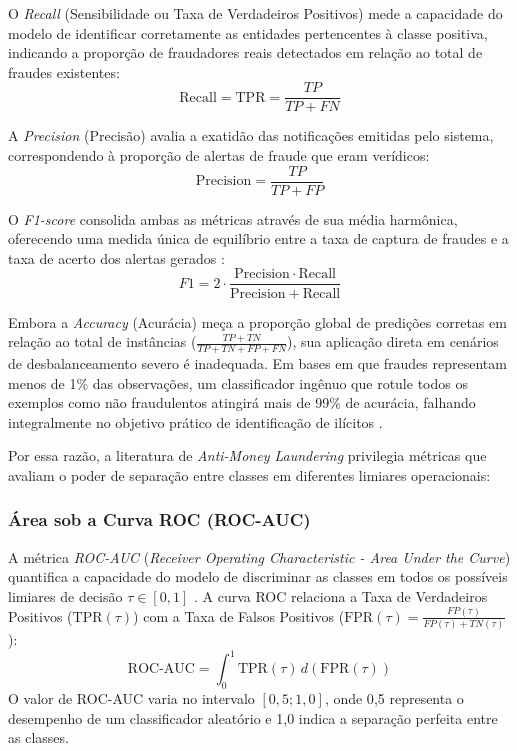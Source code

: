 \documentclass[a4paper,12pt,oneside,onecolumn,final,fleqn]{repUERJ}
\begin{document}
O \textit{Recall} (Sensibilidade ou Taxa de Verdadeiros Positivos) mede a capacidade do modelo de identificar corretamente as entidades pertencentes à classe positiva, indicando a proporção de fraudadores reais detectados em relação ao total de fraudes existentes:
\begin{equation}
    \mathrm{Recall} = \mathrm{TPR} = \frac{TP}{TP+FN}
\end{equation}

A \textit{Precision} (Precisão) avalia a exatidão das notificações emitidas pelo sistema, correspondendo à proporção de alertas de fraude que eram verídicos:
\begin{equation}
    \mathrm{Precision} = \frac{TP}{TP+FP}
\end{equation}

O \textit{F1-score} consolida ambas as métricas através de sua média harmônica, oferecendo uma medida única de equilíbrio entre a taxa de captura de fraudes e a taxa de acerto dos alertas gerados \cite{alarab2020comparative}:
\begin{equation}
    F1 = 2 \cdot \frac{\mathrm{Precision} \cdot \mathrm{Recall}}{\mathrm{Precision} + \mathrm{Recall}}
\end{equation}

Embora a \textit{Accuracy} (Acurácia) meça a proporção global de predições corretas em relação ao total de instâncias ($ \frac{TP+TN}{TP+TN+FP+FN} $), sua aplicação direta em cenários de desbalanceamento severo é inadequada. Em bases em que fraudes representam menos de 1\% das observações, um classificador ingênuo que rotule todos os exemplos como não fraudulentos atingirá mais de 99\% de acurácia, falhando integralmente no objetivo prático de identificação de ilícitos \cite{vassallo2021application}.

Por essa razão, a literatura de \textit{Anti-Money Laundering} privilegia métricas que avaliam o poder de separação entre classes em diferentes limiares operacionais:

\subsubsection{Área sob a Curva ROC (ROC-AUC)}
A métrica \textit{ROC-AUC} (\textit{Receiver Operating Characteristic - Area Under the Curve}) quantifica a capacidade do modelo de discriminar as classes em todos os possíveis limiares de decisão $\tau \in [0, 1]$ \cite{fawcett2006introduction}. A curva ROC relaciona a Taxa de Verdadeiros Positivos ($\mathrm{TPR}(\tau)$) com a Taxa de Falsos Positivos ($\mathrm{FPR}(\tau) = \frac{FP(\tau)}{FP(\tau)+TN(\tau)}$):
\begin{equation}
    \mathrm{ROC\text{-}AUC} = \int_{0}^{1} \mathrm{TPR}(\tau) \, d(\mathrm{FPR}(\tau))
\end{equation}
O valor de ROC-AUC varia no intervalo $[0{,}5; 1{,}0]$, onde 0{,}5 representa o desempenho de um classificador aleatório e 1{,}0 indica a separação perfeita entre as classes.
\end{document}
